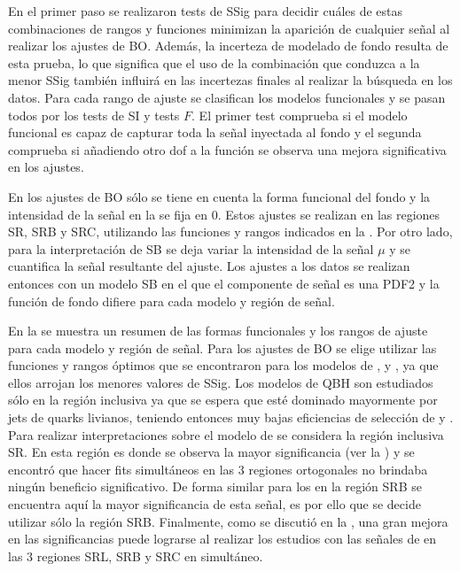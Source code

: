 En el primer paso se realizaron tests de \ac{SSig} para decidir cuáles de estas combinaciones de rangos y funciones minimizan la aparición de cualquier señal al realizar los ajustes de \ac{BO}. Además, la incerteza de modelado de fondo resulta de esta prueba, lo que significa que el uso de la combinación que conduzca a la menor \ac{SSig} también influirá en las incertezas finales al realizar la búsqueda en los datos. Para cada rango de ajuste se clasifican los modelos funcionales y se pasan todos por los tests de \ac{SI} y tests \(F\). El primer test comprueba si el modelo funcional es capaz de capturar toda la señal inyectada al fondo y el segunda comprueba si añadiendo otro \ac{dof} a la función se observa una mejora significativa en los ajustes.

En los ajustes de \ac{BO} sólo se tiene en cuenta la forma funcional del fondo y la intensidad de la señal en la \Eqn{\ref{eq:strategy:stat_treatment:stat_model:likelihood}} se fija en 0. Estos ajustes se realizan en las regiones SR, SRB y SRC, utilizando las funciones y rangos indicados en la \Tab{\ref{tab:bkg:modeling:strategy_modeling:summary}}.
Por otro lado, para la interpretación de \ac{SB} se deja variar la intensidad de la señal \(\mu\) y se cuantifica la señal resultante del ajuste. Los ajustes a los datos se realizan entonces con un modelo \ac{SB} en el que el componente de señal es una \ac{PDF2} y la función de fondo difiere para cada modelo y región de señal.

En la \Tab{\ref{tab:bkg:modeling:strategy_modeling:summary}} se muestra un resumen de las formas funcionales y los rangos de ajuste para cada modelo y región de señal. Para los ajustes de \ac{BO} se elige utilizar las funciones y rangos óptimos que se encontraron para los modelos de \qstar, \bstar y \cstar, ya que ellos arrojan los menores valores de \ac{SSig}. 
Los modelos de \ac{QBH} son estudiados sólo en la región inclusiva ya que se espera que esté dominado mayormente por jets de quarks livianos, teniendo entonces muy bajas eficiencias de selección de \bjets y \cjets.
Para realizar interpretaciones sobre el modelo de \qstar se considera la región inclusiva SR. En esta región es donde se observa la mayor significancia (ver la \Tab{\ref{tab:signals:acc_eff:qstar_signficances}}) y se encontró que hacer fits simultáneos en las 3 regiones ortogonales no brindaba ningún beneficio significativo. De forma similar para los \bstar en la región SRB se encuentra aquí la mayor significancia de esta señal, es por ello que se decide utilizar sólo la región SRB. Finalmente, como se discutió en la \Sect{\ref{sec:signals:acc_eff}}, una gran mejora en las significancias puede lograrse al realizar los estudios con las señales de \cstar en las 3 regiones SRL, SRB y SRC en simultáneo.


